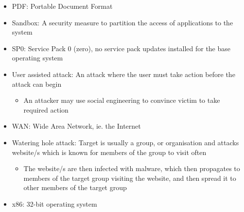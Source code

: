 \begin{itemize}
\item PDF: Portable Document Format
\item Sandbox: A security measure to partition the access of applications to the system
\item SP0: Service Pack 0 (zero), no service pack updates installed for the base operating system
\item User assisted attack: An attack where the user must take action before the attack can begin
	\begin{itemize}
	\item An attacker may use social engineering to convince victim to take required action
	\end{itemize}
\item WAN: Wide Area Network, ie. the Internet
\item Watering hole attack: Target is usually a group, or organisation and attacks website/s which is known for members of the group to visit often
	\begin{itemize}
	\item The website/s are then infected with malware, which then propagates to members of the target group visiting the website, and then spread it to other members of the target group 
	\end{itemize}
\item x86: 32-bit operating system
\end{itemize}